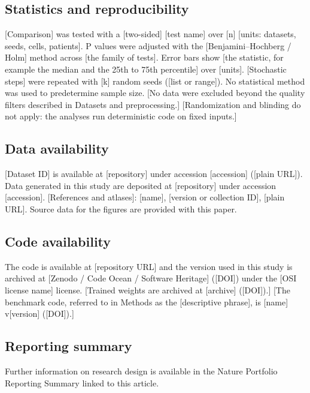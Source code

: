 
\subsection*{Statistics and reproducibility}
[Comparison] was tested with a [two-sided] [test name] over [n] [units: datasets, seeds, cells, patients].
P values were adjusted with the [Benjamini--Hochberg / Holm] method across [the family of tests].
Error bars show [the statistic, for example the median and the 25th to 75th percentile] over [units].
[Stochastic steps] were repeated with [k] random seeds ([list or range]).
No statistical method was used to predetermine sample size.
[No data were excluded beyond the quality filters described in Datasets and preprocessing.]
[Randomization and blinding do not apply: the analyses run deterministic code on fixed inputs.]

\subsection*{Data availability}
[Dataset ID] is available at [repository] under accession [accession] ([plain URL]).
Data generated in this study are deposited at [repository] under accession [accession].
[References and atlases]: [name], [version or collection ID], [plain URL].
Source data for the figures are provided with this paper.

\subsection*{Code availability}
The code is available at [repository URL] and the version used in this study is archived at
[Zenodo / Code Ocean / Software Heritage] ([DOI]) under the [OSI license name] license.
[Trained weights are archived at [archive] ([DOI]).]
[The benchmark code, referred to in Methods as the [descriptive phrase], is [name] v[version] ([DOI]).]

\subsection*{Reporting summary}
Further information on research design is available in the Nature Portfolio Reporting Summary linked to this article.

